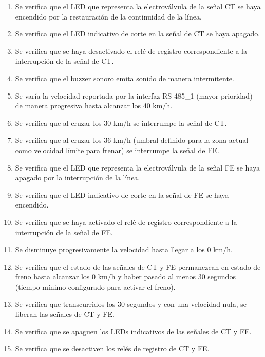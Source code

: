 \begin{enumerate}
\item	Se verifica que el LED que representa la electroválvula de la señal CT se haya encendido por la restauración de la continuidad de la línea.
\item	Se verifica que el LED indicativo de corte en la señal de CT se haya apagado.
\item	Se verifica que se haya desactivado el relé de registro correspondiente a la interrupción de la señal de CT.
\item	Se verifica que el buzzer sonoro emita sonido de manera intermitente.
\item	Se varía la velocidad reportada por la interfaz RS-485\_1 (mayor prioridad) de manera progresiva hasta alcanzar los 40 km/h.
\item	Se verifica que al cruzar los 30 km/h se interrumpe la señal de CT.
\item	Se verifica que al cruzar los 36 km/h (umbral definido para la zona actual como velocidad límite para frenar) se interrumpe la señal de FE.
\item	Se verifica que el LED que representa la electroválvula de la señal FE se haya apagado por la interrupción de la línea.
\item	Se verifica que el LED indicativo de corte en la señal de FE se haya encendido.
\item	Se verifica que se haya activado el relé de registro correspondiente a la interrupción de la señal de FE.
\item	Se disminuye progresivamente la velocidad hasta llegar a los 0 km/h.
\item	Se verifica que el estado de las señales de CT y FE permanezcan en estado de freno hasta alcanzar los 0 km/h y haber pasado al menos 30 segundos (tiempo mínimo configurado para activar el freno).
\item	Se verifica que transcurridos los 30 segundos y con una velocidad nula, se liberan las señales de CT y FE.
\item	Se verifica que se apaguen los LEDs indicativos de las señales de CT y FE.
\item	Se verifica que se desactiven los relés de registro de CT y FE.

\end{enumerate}

